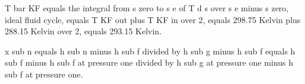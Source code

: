 T bar KF equals the integral from s zero to s e of T d s over s e minus s zero, ideal fluid cycle, equals T KF out plus T KF in over 2, equals 298.75 Kelvin plus 288.15 Kelvin over 2, equals 293.15 Kelvin.

x sub n equals h sub n minus h sub f divided by h sub g minus h sub f equals h sub f minus h sub f at pressure one divided by h sub g at pressure one minus h sub f at pressure one.